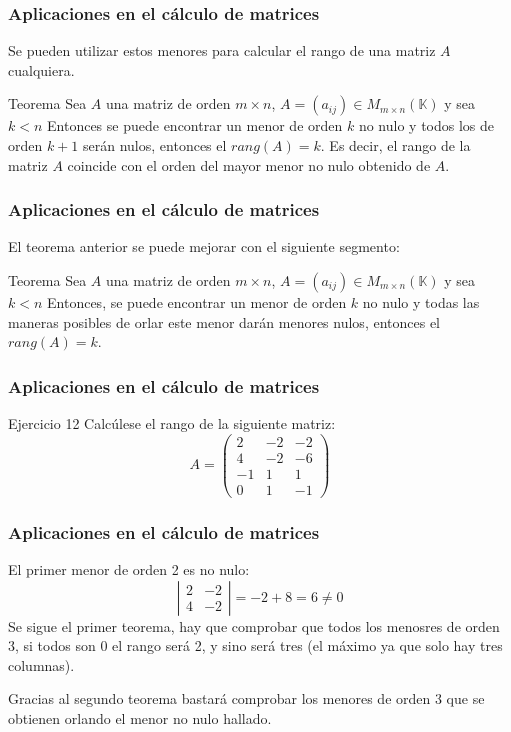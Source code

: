 \documentclass[12pt]{article}
\begin{document}
    
    \begin{frame}
  \frametitle{Aplicaciones en el c\'alculo de matrices}
Se pueden utilizar estos menores para calcular el rango de una matriz $A$ cualquiera.
     \begin{block}{Teorema}
Sea $A$ una matriz de orden $m\times n$, $A=(a_{ij})\in M_{m\times n}(\mathbb{K})$ y sea $k<n$
Entonces se puede encontrar un menor de orden $k$ no nulo y todos los de orden $k+1$ ser\'an nulos, entonces el $rang(A)=k$. Es decir, el rango de la matriz $A$ coincide con el orden del mayor menor no nulo obtenido de $A$.
\end{block}
\end{frame}  
  
     \begin{frame}
  \frametitle{Aplicaciones en el c\'alculo de matrices}
El teorema anterior se puede mejorar con el siguiente segmento:
     \begin{block}{Teorema}
Sea $A$ una matriz de orden $m\times n$, $A=(a_{ij})\in M_{m\times n}(\mathbb{K})$ y sea $k<n$
Entonces, se puede encontrar un menor de orden $k$ no nulo y todas las maneras posibles de orlar este menor dar\'an menores nulos, entonces el $rang(A)=k$.
\end{block}
\end{frame}   
  
  
     \begin{frame}
  \frametitle{Aplicaciones en el c\'alculo de matrices}
     \begin{block}{Ejercicio 12}
Calc\'ulese el rango de la siguiente matriz:
\[A = \left(\begin{array}{ccc}2 & -2 & -2 \\4 & -2 & -6 \\-1 & 1 & 1 \\0 & 1 & -1\end{array}\right)\]
\end{block}
\end{frame}  

    \begin{frame}
  \frametitle{Aplicaciones en el c\'alculo de matrices}
El primer menor de orden 2 es no nulo:
\[\left|\begin{array}{cc}2 & -2  \\4 & -2 \end{array}\right| = -2+8 = 6\neq0\]
Se sigue el primer teorema, hay que comprobar que todos los menosres de orden 3, si todos son 0 el rango ser\'a 2, y sino ser\'a tres (el m\'aximo ya que solo hay tres columnas).

Gracias al segundo teorema bastar\'a comprobar los menores de orden 3 que se obtienen orlando el menor no nulo hallado. 
\end{frame}  
\end{document}
